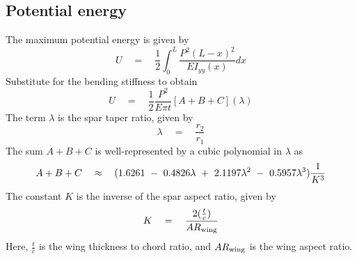 \subsection{Potential energy}
The maximum potential energy is given by 
\begin{equation*}
U \quad = \quad \frac{1}{2} \int_0^L \frac{P^2(L-x)^2}{EI_{yy}(x)} dx
\end{equation*}
Substitute for the bending stiffness to obtain 
\begin{equation*}
U \quad = \quad \frac{1}{2} \frac{P^2}{E\pi t} [A + B + C](\lambda) 
\end{equation*}
The term $\lambda$ is the spar taper ratio, given by 
\begin{equation}
\lambda \quad = \quad \frac{r_2}{r_1}
\end{equation}
The sum $A+B+C$ is well-represented by a cubic polynomial in $\lambda$ as 
\begin{equation*}
A+B+C\quad \approx \quad (1.6261 \textrm{ } - \textrm{ } 0.4826 \lambda \textrm{ } + \textrm{ } 2.1197 \lambda^2 \textrm{ } - \textrm{ } 0.5957 \lambda^3) \frac{1}{K^3}
\end{equation*}
The constant $K$ is the inverse of the spar aspect ratio, given by 
\begin{equation}
K \quad = \quad \frac{2 (\frac{t}{c})}{AR_{\rm wing}}
\end{equation}
Here, $\frac{t}{c}$ is the wing thickness to chord ratio, and $AR_{\rm wing}$ is the wing aspect ratio.

